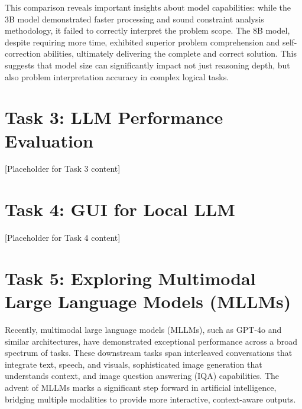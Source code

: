 \documentclass[12pt,a4paper]{article}
\begin{document}
This comparison reveals important insights about model capabilities: while the 3B model demonstrated faster processing and sound constraint analysis methodology, it failed to correctly interpret the problem scope. The 8B model, despite requiring more time, exhibited superior problem comprehension and self-correction abilities, ultimately delivering the complete and correct solution. This suggests that model size can significantly impact not just reasoning depth, but also problem interpretation accuracy in complex logical tasks.



\section{Task 3: LLM Performance Evaluation}

[Placeholder for Task 3 content]

\section{Task 4: GUI for Local LLM}

[Placeholder for Task 4 content]

\section{Task 5: Exploring Multimodal Large Language Models (MLLMs)}

Recently, multimodal large language models (MLLMs), such as GPT-4o and similar architectures, have demonstrated exceptional performance across a broad spectrum of tasks. These downstream tasks span interleaved conversations that integrate text, speech, and visuals, sophisticated image generation that understands context, and image question answering (IQA) capabilities. The advent of MLLMs marks a significant step forward in artificial intelligence, bridging multiple modalities to provide more interactive, context-aware outputs.
\end{document}
